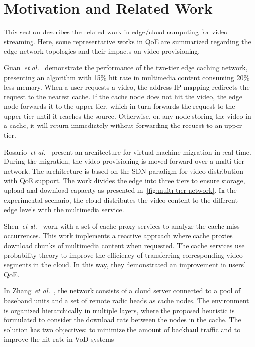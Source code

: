 \section{Motivation and Related Work}
\label{sec:related-work}

This section describes the related work in edge/cloud computing for video streaming. Here, some representative works in QoE are summarized regarding the edge network topologies and their impacts on video provisioning.

Guan~\textit{et al.}~\cite{guan:2019:CLC} demonstrate the performance of the two-tier edge caching network, presenting an algorithm with 15\% hit rate in multimedia content consuming 20\% less memory. When a user requests a video, the address IP mapping redirects the request to the nearest cache. If the cache node does not hit the video, the edge node forwards it to the upper tier, which in turn forwards the request to the upper tier until it reaches the source. Otherwise, on any node storing the video in a cache, it will return immediately without forwarding the request to an upper tier.

Rosario~\textit{et al.}~\cite{rosarioSENSORS2018} present an architecture for virtual machine migration in real-time. During the migration, the video provisioning is moved forward over a multi-tier network. The architecture is based on the SDN paradigm for video distribution with QoE support. The work divides the edge into three tiers to ensure storage, upload and download capacity as presented in~\ref{fig:multi-tier-network}. In the experimental scenario, the cloud distributes the video content to the different edge levels with the multimedia service.

Shen~\textit{et al.}~\cite{shenIWQoS19} work with a set of cache proxy services to analyze the cache miss occurrences. This work implements a reactive approach where cache proxies download chunks of multimedia content when requested. The cache services use probability theory to improve the efficiency of transferring corresponding video segments in the cloud. In this way, they demonstrated an improvement in users' QoE.

In Zhang~\textit{et al.}~\cite{zhang:WCNC2017}, the network consists of a cloud server connected to a pool of baseband units and a set of remote radio heads as cache nodes. The environment is organized hierarchically in multiple layers, where the proposed heuristic is formulated to consider the download rate between the nodes in the cache. The solution has two objectives: to minimize the amount of backhaul traffic and to improve the hit rate in VoD systems

